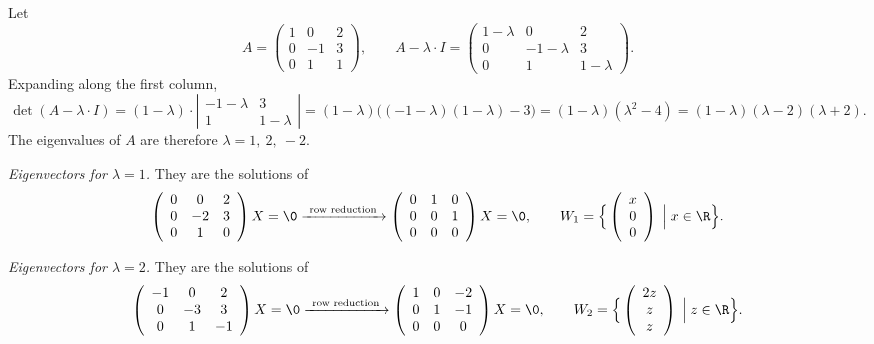 \begin{example}
Let
\[
A=\left( \begin{array}{ccc} 1 & 0 & 2\\ 0 & -1 & 3\\ 0 & 1 & 1 \end{array} \right),
\qquad
A-\lambda \cdot I=\left( \begin{array}{ccc} 1-\lambda & 0 & 2\\ 0 & -1-\lambda & 3\\ 0 & 1 & 1-\lambda \end{array} \right).
\]
Expanding along the first column,
\[
\det(A-\lambda \cdot I)=
(1-\lambda)\cdot \left| \begin{array}{cc} -1-\lambda & 3\\ 1 & 1-\lambda \end{array} \right|
= (1-\lambda)\big((-1-\lambda)(1-\lambda)-3\big)
= (1-\lambda)(\lambda^2-4) = (1-\lambda)(\lambda-2)(\lambda+2).
\]
The eigenvalues of $A$ are therefore $\lambda = 1,\ 2,\ -2$.

\medskip
\noindent\emph{Eigenvectors for $\lambda = 1$.} They are the solutions of
\[
\left( \begin{array}{ccc} 0 & 0 & 2\\ 0 & -2 & 3\\ 0 & 1 & 0 \end{array} \right)X = \0
\xrightarrow{\ \text{row reduction}\ }
\left( \begin{array}{ccc} 0 & 1 & 0 \\ 0 & 0 & 1\\ 0 & 0 & 0 \end{array} \right)X = \0,
\qquad
W_1 = \Big\{ \left( \begin{array}{c} x \\ 0 \\ 0 \end{array} \right) \;\Big|\; x\in \R \Big\}.
\]

\noindent\emph{Eigenvectors for $\lambda = 2$.} They are the solutions of
\[
\left( \begin{array}{ccc} -1 & 0 & 2\\ 0 & -3 & 3\\ 0 & 1 & -1 \end{array} \right)X = \0
\xrightarrow{\ \text{row reduction}\ }
\left( \begin{array}{ccc} 1 & 0 & -2\\ 0 & 1 & -1\\ 0 & 0 & 0 \end{array} \right)X = \0,
\qquad
W_2 = \Big\{ \left( \begin{array}{c} 2z \\ z \\ z \end{array} \right) \;\Big|\; z\in \R \Big\}.
\]


\end{example}
